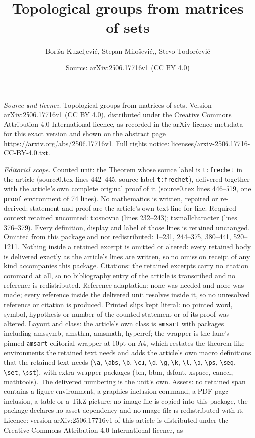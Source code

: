 \documentclass[10pt,a4paper]{amsart}
\title[Topological groups from matrices of sets]{Topological groups from matrices of sets}
\author{Bori\v{s}a Kuzeljevi\'c, Stepan Milo\v{s}evi\'c,, Stevo Todor\v{c}evi\'c}
\date{Source: arXiv:2506.17716v1 (CC BY 4.0)}
\begin{document}
\maketitle

\noindent\emph{Source and licence.} Topological groups from matrices of sets. Version arXiv:2506.17716v1 (CC BY 4.0), distributed under the Creative Commons Attribution 4.0 International licence, as recorded in the arXiv licence metadata for this exact version and shown on the abstract page https://arxiv.org/abs/2506.17716v1. Full rights notice: licenses/arxiv-2506.17716-CC-BY-4.0.txt.\par\smallskip

\noindent\textit{Editorial scope.} Counted unit: the Theorem whose source label is \texttt{t:frechet} in the article (source0.tex lines 442--445, source label \texttt{t:frechet}), delivered together with the article's own complete original proof of it (source0.tex lines 446--519, one \texttt{proof} environment of 74 lines). No mathematics is written, repaired or re-derived: statement and proof are the article's own text line for line. Required context retained uncounted: t:osnovna (lines 232--243); t:smallcharacter (lines 376--379). Every definition, display and label of those lines is retained unchanged. Omitted from this package and not redistributed: 1--231, 244--375, 380--441, 520--1211. Nothing inside a retained excerpt is omitted or altered: every retained body is delivered exactly as the article's lines are written, so no omission receipt of any kind accompanies this package. Citations: the retained excerpts carry no citation command at all, so no bibliography entry of the article is transcribed and no reference is redistributed. Reference adaptation: none was needed and none was made; every reference inside the delivered unit resolves inside it, so no unresolved reference or citation is produced. Printed slips kept literal: no printed word, symbol, hypothesis or number of the counted statement or of its proof was altered. Layout and class: the article's own class is \texttt{amsart} with packages including amssymb, amsthm, amsmath, hyperref; the wrapper is the lane's pinned \texttt{amsart} editorial wrapper at 10pt on A4, which restates the theorem-like environments the retained text needs and adds the article's own macro definitions that the retained text needs (\texttt{\textbackslash a}, \texttt{\textbackslash abs}, \texttt{\textbackslash b}, \texttt{\textbackslash cu}, \texttt{\textbackslash d}, \texttt{\textbackslash g}, \texttt{\textbackslash k}, \texttt{\textbackslash l}, \texttt{\textbackslash o}, \texttt{\textbackslash ps}, \texttt{\textbackslash seq}, \texttt{\textbackslash set}, \texttt{\textbackslash sst}), with extra wrapper packages (bm, bbm, dsfont, xspace, cancel, mathtools). The delivered numbering is the unit's own. Assets: no retained span contains a figure environment, a graphics-inclusion command, a PDF-page inclusion, a table or a TikZ picture; no image file is copied into this package, the package declares no asset dependency and no image file is redistributed with it. Licence: version arXiv:2506.17716v1 of this article is distributed under the Creative Commons Attribution 4.0 International licence, as 
\end{document}
